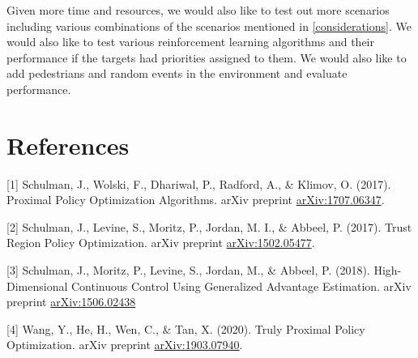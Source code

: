 \documentclass{article}
\begin{document}
Given more time and resources, we would also like to test out more scenarios including various combinations of the scenarios mentioned in \ref{considerations}. We would also like to test various reinforcement learning algorithms and their performance if the targets had priorities assigned to them. We would also like to add pedestrians and random events in the environment and evaluate performance.

\section*{References}


[1] Schulman, J., Wolski, F., Dhariwal, P., Radford, A., \& Klimov, O. (2017). Proximal Policy Optimization Algorithms. arXiv preprint \href{https://arxiv.org/abs/1707.06347}{arXiv:1707.06347}.

[2] Schulman, J., Levine, S., Moritz, P., Jordan, M. I., \& Abbeel, P. (2017). Trust Region Policy Optimization. arXiv preprint \href{https://arxiv.org/abs/1502.05477}{arXiv:1502.05477}.

[3] Schulman, J., Moritz, P., Levine, S., Jordan, M., \& Abbeel, P. (2018). High-Dimensional Continuous Control Using Generalized Advantage Estimation. arXiv preprint \href{https://arxiv.org/abs/1506.02438}{arXiv:1506.02438}

[4] Wang, Y., He, H., Wen, C., \& Tan, X. (2020). Truly Proximal Policy Optimization. arXiv preprint \href{https://arxiv.org/abs/1903.07940}{arXiv:1903.07940}.
\end{document}
